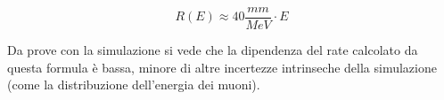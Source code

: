 \begin{equation}
	R(E) \approx 40 \frac{mm}{MeV}\cdot E
	\label{eq:range_elec}
\end{equation}

Da prove con la simulazione si vede che la dipendenza del rate calcolato da questa formula \`e bassa, minore di altre incertezze intrinseche della simulazione (come la distribuzione dell'energia dei muoni).
